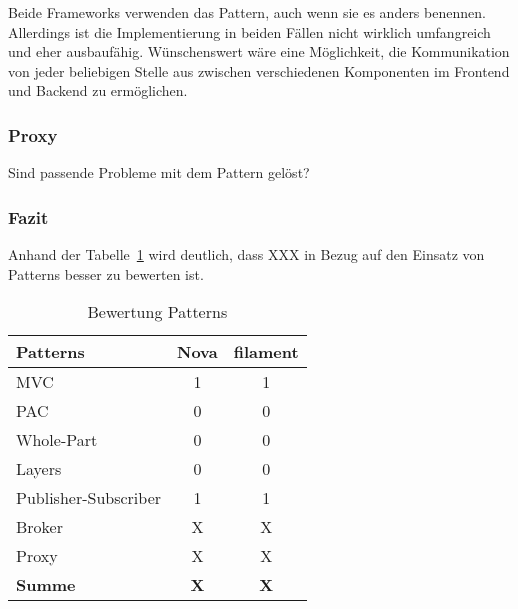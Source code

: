 Beide Frameworks verwenden das Pattern, auch wenn sie es anders benennen.
Allerdings ist die Implementierung in beiden Fällen nicht wirklich umfangreich und eher ausbaufähig.
Wünschenswert wäre eine Möglichkeit, die Kommunikation von jeder beliebigen Stelle aus zwischen verschiedenen Komponenten im Frontend und Backend zu ermöglichen.

\subsubsection{Proxy}
\color{red}
Sind passende Probleme mit dem Pattern gelöst?
\color{black}

\subsubsection{Fazit}

\color{red}
Anhand der Tabelle~\ref{tab:bewertung-patterns} wird deutlich, dass XXX in Bezug auf den Einsatz von Patterns besser zu bewerten ist.

\begin{table}[]
    \caption{Bewertung Patterns}
    \label{tab:bewertung-patterns}
    \centering
    \begin{tabular}{|l|c|c|}
        \hline
        \textbf{Patterns}    & \textbf{Nova} & \textbf{filament} \\ \hline
        MVC                  & 1             & 1                 \\ \hline
        PAC                  & 0             & 0                 \\ \hline
        Whole-Part           & 0             & 0                 \\ \hline
        Layers               & 0             & 0                 \\ \hline
        Publisher-Subscriber & 1             & 1                 \\ \hline
        Broker               & X             & X                 \\ \hline
        Proxy                & X             & X                 \\ \hline
        \textbf{Summe}       & \textbf{X}    & \textbf{X}        \\ \hline
    \end{tabular}
\end{table}
\color{black}
